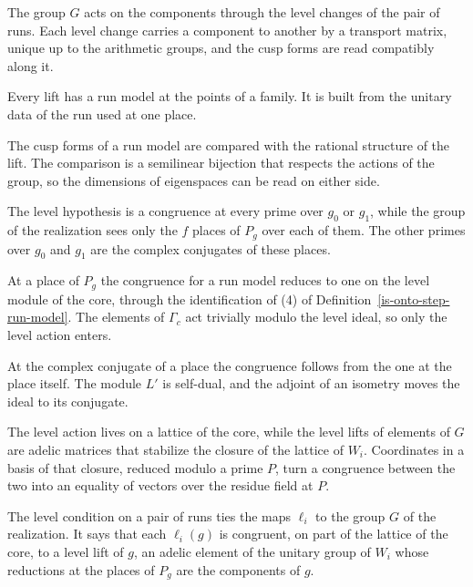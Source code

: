 The group $G$ acts on the components through the level changes of the pair of runs. Each level change
carries a component to another by a transport matrix, unique up to the arithmetic groups, and the
cusp forms are read compatibly along it.

Every lift has a run model at the points of a family. It is built from the unitary data of the run
used at one place.

The cusp forms of a run model are compared with the rational structure of the lift. The comparison
is a semilinear bijection that respects the actions of the group, so the dimensions of eigenspaces
can be read on either side.

The level hypothesis is a congruence at every prime over $g_0$ or $g_1$, while the group of the
realization sees only the $f$ places of $P_g$ over each of them. The other primes over $g_0$ and $g_1$
are the complex conjugates of these places.

At a place of $P_g$ the congruence for a run model reduces to one on the level module of the core,
through the identification of (4) of Definition~\ref{is-onto-step-run-model}. The elements of
$\Gamma_c$ act trivially modulo the level ideal, so only the level action enters.

At the complex conjugate of a place the congruence follows from the one at the place itself. The
module $L'$ is self-dual, and the adjoint of an isometry moves the ideal to its conjugate.

The level action lives on a lattice of the core, while the level lifts of elements of $G$ are adelic
matrices that stabilize the closure of the lattice of $W_i$. Coordinates in a basis of that closure,
reduced modulo a prime $P$, turn a congruence between the two into an equality of vectors over the
residue field at $P$.

The level condition on a pair of runs ties the maps $\ell_i$ to the group $G$ of the realization. It
says that each $\ell_i(g)$ is congruent, on part of the lattice of the core, to a level lift of $g$, an
adelic element of the unitary group of $W_i$ whose reductions at the places of $P_g$ are the components
of $g$.

